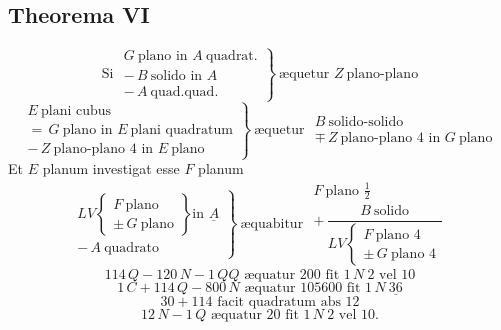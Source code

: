 \documentclass[11pt,a4paper]{article}
\begin{document}
\subsection*{Theorema VI}

\[ \text{Si } \left.\begin{array}{l} G\ \text{plano in } A\ \text{quadrat.} \\ -\,B\ \text{solido in } A \\ -\,A\ \text{quad.quad.} \end{array}\right\}\ \text{æquetur } Z\ \text{plano-plano} \]
\marginal{$\pm$ \quad $\mp$}
\[ \left.\begin{array}{l} E\ \text{plani cubus} \\ =\,G\ \text{plano in } E\ \text{plani quadratum} \\ -\,Z\ \text{plano-plano } 4 \text{ in } E\ \text{plano} \end{array}\right\}\ \text{æquetur } \begin{array}{l} B\ \text{solido-solido} \\ \mp\,Z\ \text{plano-plano } 4 \text{ in } G\ \text{plano} \end{array} \]
Et $E$ planum investigat esse $F$ planum
\[ \left.\begin{array}{l} LV \left\{\begin{array}{l} F\ \text{plano} \\ \pm\,G\ \text{plano} \end{array}\right\} \text{in } \underline{A} \\ -\,A\ \text{quadrato} \end{array}\right\}\ \text{æquabitur } \begin{array}{l} F\ \text{plano } \frac{1}{2} \\ +\,\dfrac{B\ \text{solido}}{LV \left\{\begin{array}{l} F\ \text{plano } 4 \\ \pm\,G\ \text{plano } 4 \end{array}\right.} \end{array} \]
\marginal{$\mp$}
\[ 114\,Q - 120\,N - 1\,QQ \text{ æquatur } 200 \text{ fit } 1\,N\ 2 \text{ vel } 10 \]
\[ 1\,C + 114\,Q - 800\,N \text{ æquatur } 105600 \text{ fit } 1\,N\ \underline{36} \]
\[ 30 + 114 \text{ facit quadratum abs } 12 \]
\[ 12\,N - 1\,Q \text{ æquatur } 20 \text{ fit } 1\,N\ 2 \text{ vel } 10. \]
\end{document}
